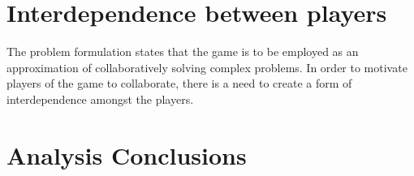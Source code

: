 	
	\section{Interdependence between players} \label{sec:interdependence}
		The problem formulation states that the game is to be employed as an 
		approximation of collaboratively solving complex problems. In order to
		motivate players of the game to collaborate, there is a need to create
		a form of interdependence amongst the players. 
		
	\section{Analysis Conclusions} \label{sec:analysisconclusion}
